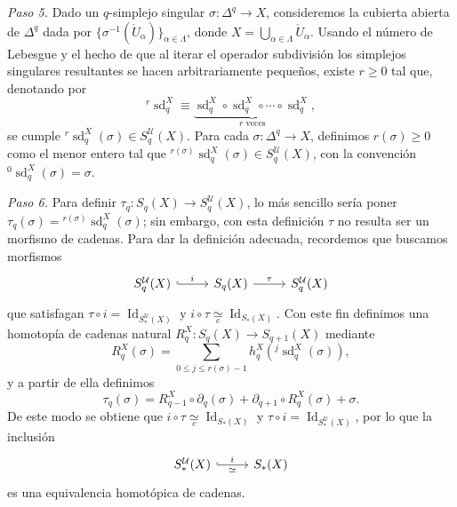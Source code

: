 \begin{dem}
\smallskip
\noindent\textit{Paso 5.} Dado un $q$-simplejo singular $\sigma \colon \Delta^q \to X$, consideremos la cubierta abierta de $\Delta^q$ dada por $\{\sigma^{-1}(\mathring{U}_\alpha)\}_{\alpha \in \Lambda}$, donde $X = \bigcup_{\alpha \in \Lambda} \mathring{U}_\alpha$. Usando el número de Lebesgue y el hecho de que al iterar el operador subdivisión los simplejos singulares resultantes se hacen arbitrariamente pequeños, existe $r \geq 0$ tal que, denotando por
\[
{}^r\operatorname{sd}_q^X \equiv \underbrace{\operatorname{sd}_q^X \circ \operatorname{sd}_q^X \circ \cdots \circ \operatorname{sd}_q^X}_{r \text{ veces}},
\]
se cumple ${}^r\operatorname{sd}_q^X(\sigma) \in S_q^{\mathcal{U}}(X)$. Para cada $\sigma \colon \Delta^q \to X$, definimos $r(\sigma) \geq 0$ como el menor entero tal que ${}^{r(\sigma)}\operatorname{sd}_q^X(\sigma) \in S_q^{\mathcal{U}}(X)$, con la convención ${}^0\operatorname{sd}_q^X(\sigma) = \sigma$.

\smallskip
\noindent\textit{Paso 6.} Para definir $\tau_q \colon S_q(X) \to S_q^{\mathcal{U}}(X)$, lo más sencillo sería poner $\tau_q(\sigma) = {}^{r(\sigma)}\operatorname{sd}_q^X(\sigma)$; sin embargo, con esta definición $\tau$ no resulta ser un morfismo de cadenas. Para dar la definición adecuada, recordemos que buscamos morfismos
\[
\begin{tikzcd}[column sep=2.6em]
S_q^{\mathcal{U}}(X) \arrow[r, hook, "i"] & S_q(X) \arrow[r, "\tau"] & S_q^{\mathcal{U}}(X)
\end{tikzcd}
\]
que satisfagan $\tau \circ i = \operatorname{Id}_{S_*^{\mathcal{U}}(X)}$ y $i \circ \tau \underset{c}{\simeq} \operatorname{Id}_{S_*(X)}$. Con este fin definimos una homotopía de cadenas natural $R_q^X \colon S_q(X) \to S_{q+1}(X)$ mediante
\[
R_q^X(\sigma) = \sum_{0 \leq j \leq r(\sigma) - 1} h_q^X\!\left({}^j\operatorname{sd}_q^X(\sigma)\right),
\]
y a partir de ella definimos
\[
\tau_q(\sigma) = R_{q-1}^X \circ \partial_q(\sigma) + \partial_{q+1} \circ R_q^X(\sigma) + \sigma.
\]
De este modo se obtiene que $i \circ \tau \underset{c}{\simeq} \operatorname{Id}_{S_*(X)}$ y $\tau \circ i = \operatorname{Id}_{S_*^{\mathcal{U}}(X)}$, por lo que la inclusión
\[
\begin{tikzcd}[column sep=2.6em]
S_*^{\mathcal{U}}(X) \arrow[r, hook, "i", "\simeq"'] & S_*(X)
\end{tikzcd}
\]
es una equivalencia homotópica de cadenas.
\end{dem}

